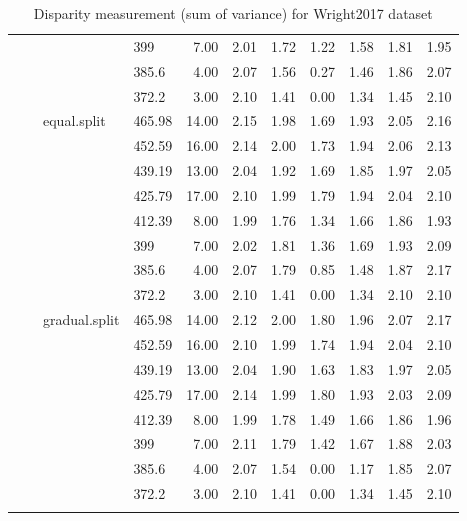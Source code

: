 \begin{longtable}{llllrrrrrrr}
   &  &  & 399 & 7.00 & 2.01 & 1.72 & 1.22 & 1.58 & 1.81 & 1.95 \\ 
   &  &  & 385.6 & 4.00 & 2.07 & 1.56 & 0.27 & 1.46 & 1.86 & 2.07 \\ 
   &  &  & 372.2 & 3.00 & 2.10 & 1.41 & 0.00 & 1.34 & 1.45 & 2.10 \\ 
   &  & equal.split & 465.98 & 14.00 & 2.15 & 1.98 & 1.69 & 1.93 & 2.05 & 2.16 \\ 
   &  &  & 452.59 & 16.00 & 2.14 & 2.00 & 1.73 & 1.94 & 2.06 & 2.13 \\ 
   &  &  & 439.19 & 13.00 & 2.04 & 1.92 & 1.69 & 1.85 & 1.97 & 2.05 \\ 
   &  &  & 425.79 & 17.00 & 2.10 & 1.99 & 1.79 & 1.94 & 2.04 & 2.10 \\ 
   &  &  & 412.39 & 8.00 & 1.99 & 1.76 & 1.34 & 1.66 & 1.86 & 1.93 \\ 
   &  &  & 399 & 7.00 & 2.02 & 1.81 & 1.36 & 1.69 & 1.93 & 2.09 \\ 
   &  &  & 385.6 & 4.00 & 2.07 & 1.79 & 0.85 & 1.48 & 1.87 & 2.17 \\ 
   &  &  & 372.2 & 3.00 & 2.10 & 1.41 & 0.00 & 1.34 & 2.10 & 2.10 \\ 
   &  & gradual.split & 465.98 & 14.00 & 2.12 & 2.00 & 1.80 & 1.96 & 2.07 & 2.17 \\ 
   &  &  & 452.59 & 16.00 & 2.10 & 1.99 & 1.74 & 1.94 & 2.04 & 2.10 \\ 
   &  &  & 439.19 & 13.00 & 2.04 & 1.90 & 1.63 & 1.83 & 1.97 & 2.05 \\ 
   &  &  & 425.79 & 17.00 & 2.14 & 1.99 & 1.80 & 1.93 & 2.03 & 2.09 \\ 
   &  &  & 412.39 & 8.00 & 1.99 & 1.78 & 1.49 & 1.66 & 1.86 & 1.96 \\ 
   &  &  & 399 & 7.00 & 2.11 & 1.79 & 1.42 & 1.67 & 1.88 & 2.03 \\ 
   &  &  & 385.6 & 4.00 & 2.07 & 1.54 & 0.00 & 1.17 & 1.85 & 2.07 \\ 
   &  &  & 372.2 & 3.00 & 2.10 & 1.41 & 0.00 & 1.34 & 1.45 & 2.10 \\ 
   \hline
\hline
\caption{Disparity measurement (sum of variance) for Wright2017 dataset} 
\end{longtable}


